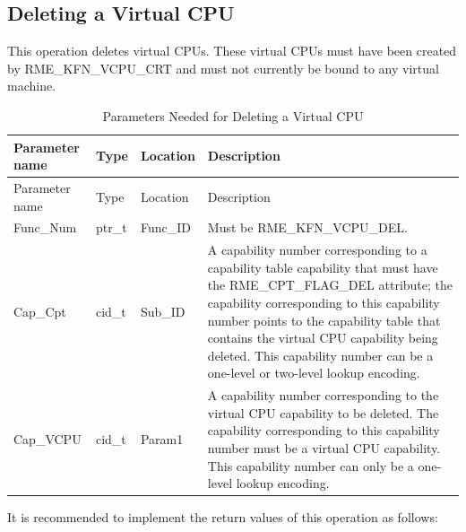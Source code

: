 \subsection{Deleting a Virtual CPU}\label{subsec:8-delete-virtual-cpu}

This operation deletes virtual CPUs. These virtual CPUs must have been created by RME\_KFN\_VCPU\_CRT and must not currently be bound to any virtual machine.

\begin{xltabular}{\textwidth}{@{}>{\hsize\raggedright\arraybackslash}X>{\hsize\raggedright\arraybackslash}X>{\hsize\raggedright\arraybackslash}X>{\hsize\raggedright\arraybackslash}X@{}}
\caption{Parameters Needed for Deleting a Virtual CPU}\label{tab:8-87-delete-virtual-cpu-parameters}\\
\toprule
Parameter name & Type & Location & Description\tabularnewline
\endfirsthead
\toprule
Parameter name & Type & Location & Description\tabularnewline
\midrule
\endhead
\bottomrule
\endlastfoot
Func\_Num & ptr\_t & Func\_ID &
Must be RME\_KFN\_VCPU\_DEL.\tabularnewline
Cap\_Cpt & cid\_t & Sub\_ID &
A capability number corresponding to a capability table capability that must have the RME\_CPT\_FLAG\_DEL attribute; the capability corresponding to this capability number points to the capability table that contains the virtual CPU capability being deleted. This capability number can be a one-level or two-level lookup encoding.\tabularnewline
Cap\_VCPU & cid\_t & Param1 &
A capability number corresponding to the virtual CPU capability to be deleted. The capability corresponding to this capability number must be a virtual CPU capability. This capability number can only be a one-level lookup encoding.\tabularnewline
\end{xltabular}
\nopagebreak[4]

It is recommended to implement the return values of this operation as follows:

